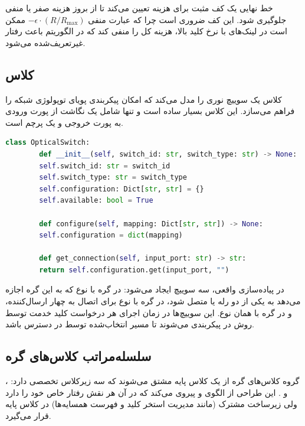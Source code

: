 خط نهایی  یک کف مثبت برای هزینه تعیین می‌کند تا از بروز هزینه صفر یا منفی جلوگیری شود. این کف ضروری است چرا که عبارت منفی $-\epsilon \cdot (R/R_{\max})$ ممکن است در لینک‌های با نرخ کلید بالا، هزینه کل را منفی کند که در الگوریتم  باعث رفتار غیرتعریف‌شده می‌شود.

\subsection{کلاس }

کلاس  یک سوییچ نوری را مدل می‌کند که امکان پیکربندی پویای توپولوژی شبکه را فراهم می‌سازد. این کلاس بسیار ساده است و تنها شامل یک نگاشت از پورت ورودی به پورت خروجی و یک پرچم  است.

\begin{LTR}
	\begin{lstlisting}[language=Python]
		class OpticalSwitch:
		def __init__(self, switch_id: str, switch_type: str) -> None:
		self.switch_id: str = switch_id
		self.switch_type: str = switch_type
		self.configuration: Dict[str, str] = {}
		self.available: bool = True
		
		def configure(self, mapping: Dict[str, str]) -> None:
		self.configuration = dict(mapping)
		
		def get_connection(self, input_port: str) -> str:
		return self.configuration.get(input_port, "")
	\end{lstlisting}
\end{LTR}

در پیاده‌سازی واقعی، سه سوییچ ایجاد می‌شود:  در گره  با نوع  که به این گره اجازه می‌دهد به یکی از دو رله  یا  متصل شود،  در گره  با نوع  برای اتصال به چهار ارسال‌کننده، و  در گره  با همان نوع. این سوییچ‌ها در زمان اجرای هر درخواست کلید خدمت توسط روش  در  پیکربندی می‌شوند تا مسیر انتخاب‌شده توسط  در دسترس باشد.

\subsection{سلسله‌مراتب کلاس‌های گره}

گروه کلاس‌های گره از یک کلاس پایه  مشتق می‌شوند که سه زیرکلاس تخصصی دارد: ،  و . این طراحی از الگوی  و  پیروی می‌کند که در آن هر نقش رفتار خاص خود را دارد ولی زیرساخت مشترک (مانند مدیریت استخر کلید و فهرست همسایه‌ها) در کلاس پایه قرار می‌گیرد.

